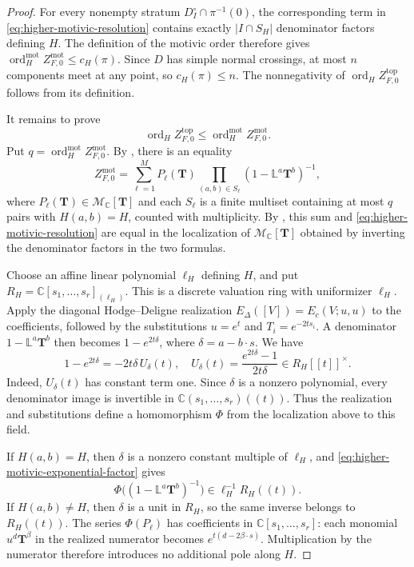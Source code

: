 \documentclass[12pt]{amsart}
\numberwithin{equation}{section}
\theoremstyle{plain}
\theoremstyle{definition}
\theoremstyle{remark}
\theoremstyle{definition}
\DeclareMathOperator{\ord}{ord}
\newcommand{\C}{\mathbb C}
\newcommand{\Lef}{\mathbb L}
\newcommand{\Mmot}{\mathcal M_{\mathbb C}}
\begin{document}
\begin{proof}
For every nonempty stratum $D_I^\circ\cap\pi^{-1}(0)$, the corresponding term in \eqref{eq:higher-motivic-resolution} contains exactly $|I\cap S_H|$ denominator factors defining $H$. The definition of the motivic order therefore gives $\ord_H^{\mathrm{mot}}Z^{\mathrm{mot}}_{F,0}\leq c_H(\pi)$. Since $D$ has simple normal crossings, at most $n$ components meet at any point, so $c_H(\pi)\leq n$. The nonnegativity of $\ord_HZ^{\mathrm{top}}_{F,0}$ follows from its definition.

It remains to prove
\[
\ord_HZ^{\mathrm{top}}_{F,0}\leq\ord_H^{\mathrm{mot}}Z^{\mathrm{mot}}_{F,0}.
\]
Put $q=\ord_H^{\mathrm{mot}}Z^{\mathrm{mot}}_{F,0}$. By , there is an equality
\[
Z^{\mathrm{mot}}_{F,0}
=
\sum_{\ell=1}^M P_\ell(\mathbf T)
\prod_{(a,b)\in S_\ell}(1-\Lef^a\mathbf T^b)^{-1},
\]
where $P_\ell(\mathbf T)\in\Mmot[\mathbf T]$ and each $S_\ell$ is a finite multiset containing at most $q$ pairs with $H(a,b)=H$, counted with multiplicity. By , this sum and \eqref{eq:higher-motivic-resolution} are equal in the localization of $\Mmot[\mathbf T]$ obtained by inverting the denominator factors in the two formulas.

Choose an affine linear polynomial $\ell_H$ defining $H$, and put $R_H=\C[s_1,\ldots,s_r]_{(\ell_H)}$. This is a discrete valuation ring with uniformizer $\ell_H$. Apply the diagonal Hodge--Deligne realization $E_\Delta([V])=E_c(V;u,u)$ to the coefficients, followed by the substitutions $u=e^t$ and $T_i=e^{-2ts_i}$. A denominator $1-\Lef^a\mathbf T^b$ then becomes $1-e^{2t\delta}$, where $\delta=a-b\cdot s$. We have
\begin{equation}\label{eq:higher-motivic-exponential-factor}
1-e^{2t\delta}
=
-2t\delta\,U_\delta(t),
\quad
U_\delta(t)=\frac{e^{2t\delta}-1}{2t\delta}
\in R_H[\![t]\!]^\times.
\end{equation}
Indeed, $U_\delta(t)$ has constant term one. Since $\delta$ is a nonzero polynomial, every denominator image is invertible in $\C(s_1,\ldots,s_r)((t))$. Thus the realization and substitutions define a homomorphism $\Phi$ from the localization above to this field.

If $H(a,b)=H$, then $\delta$ is a nonzero constant multiple of $\ell_H$, and \eqref{eq:higher-motivic-exponential-factor} gives
\[
\Phi\bigl((1-\Lef^a\mathbf T^b)^{-1}\bigr)
\in \ell_H^{-1}R_H((t)).
\]
If $H(a,b)\ne H$, then $\delta$ is a unit in $R_H$, so the same inverse belongs to $R_H((t))$. The series $\Phi(P_\ell)$ has coefficients in $\C[s_1,\ldots,s_r]$: each monomial $u^d\mathbf T^\beta$ in the realized numerator becomes $e^{t(d-2\beta\cdot s)}$. Multiplication by the numerator therefore introduces no additional pole along $H$.


\end{proof}
\end{document}
